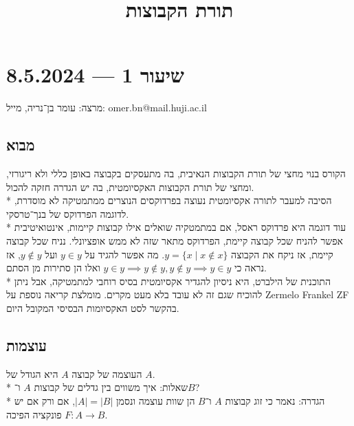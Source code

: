 
\usepackage{hyperref}
\hypersetup{}
\title{תורת הקבוצות}


\maketitle
\maketitleprint{}

\tableofcontents

\section{שיעור 1 --- 8.5.2024}

מרצה: עומר בן־נריה, מייל: omer.bn@mail.huji.ac.il

\subsection{מבוא}
הקורס בנוי מחצי של תורת הקבוצות הנאיבית, בה מתעסקים בקבוצה באופן כללי ולא ריגורזי, ומחצי של תורת הקבוצות האקסיומטית, בה יש הגדרה חזקה להכול. \\*
הסיבה למעבר לתורה אקסיומטית נעוצה בפרדוקסים הנוצרים ממתמטיקה לא מוסדרת, לדוגמה הפרדוקס של בנך־טרסקי. \\*
עוד דוגמה היא פרדוקס ראסל, אם במתמטקיה שואלים אילו קבוצות קיימות, אינטואיטיבית אפשר להניח שכל קבוצה קיימת, הפרדוקס מתאר שזה לא ממש אופציונלי. נניח שכל קבוצה קיימת, אז ניקח את הקבוצה $y = \{x \mid x \not\in x\}$.
מה אפשר להגיד על $y \in y$ ועל $y \not\in y$, אז נראה כי $y \in y \implies y \not\in y, y\not\in y \implies y \in y$ ואלו הן סתירות מן הסתם. \\*
התוכנית של הילברט, היא ניסיון להגדיר אקסיומטית בסיס רוחבי למתמטיקה, אבל ניתן להוכיח שגם זה לא עובד בלא מעט מקרים.
מומלצת קריאה נוספת על Zermelo Frankel ZF בהקשר לסט האקסיומות הבסיסי המקובל היום.

\subsection{עוצמות}
העוצמה של קבוצה $A$ היא הגודל של $A$. \\*
שאלות: איך משווים בין גדלים של קבוצות $A$ ו־$B$? \\*
הגדרה: נאמר כי זוג קבוצות $A$ ו־$B$ הן שוות עוצמה ונסמן $|A| = |B|$, אם ורק אם יש פונקציה הפיכה $F: A \to B$.

